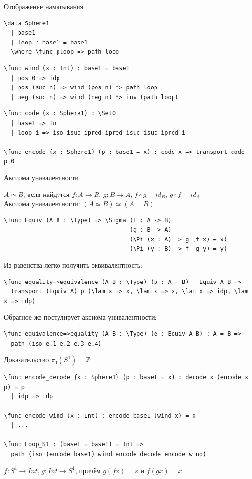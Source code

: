 \documentclass[aspectratio=169,dvipsnames,usenames]{beamer}
\begin{document}
\begin{frame}[fragile]{Отображение наматывания}
\begin{verbatim}
\data Sphere1
  | base1
  | loop : base1 = base1
  \where \func ploop => path loop
\end{verbatim}

\begin{verbatim}
\func wind (x : Int) : base1 = base1
  | pos 0 => idp
  | pos (suc n) => wind (pos n) *> path loop
  | neg (suc n) => wind (neg n) *> inv (path loop)
\end{verbatim}

\begin{verbatim}
\func code (x : Sphere1) : \Set0
  | base1 => Int
  | loop i => iso isuc ipred ipred_isuc isuc_ipred i

\func encode (x : Sphere1) (p : base1 = x) : code x => transport code p 0
\end{verbatim}
\end{frame}

\begin{frame}[fragile]{Аксиома унивалентности}
\begin{dfn}
$A \simeq B$, если найдутся $f: A \rightarrow B$, $g: B \rightarrow A$, $f\circ g = id_B$, $g \circ f = id_A$\\
Аксиома унивалентности: $(A \simeq B) \simeq (A = B)$ \end{dfn}

\small
\begin{verbatim}
\func Equiv (A B : \Type) => \Sigma (f : A -> B)
                                    (g : B -> A)
                                    (\Pi (x : A) -> g (f x) = x)
                                    (\Pi (y : B) -> f (g y) = y)
\end{verbatim}
\normalsize

Из равенства легко получить эквивалентность:
\small
\begin{verbatim}
\func equality=>equivalence (A B : \Type) (p : A = B) : Equiv A B =>
  transport (Equiv A) p (\lam x => x, \lam x => x, \lam x => idp, \lam x => idp)
\end{verbatim}
\normalsize

Обратное же постулирует аксиома унивалентности:
\small
\begin{verbatim}
\func equivalence=>equality (A B : \Type) (e : Equiv A B) : A = B =>
  path (iso e.1 e.2 e.3 e.4)
\end{verbatim}
\normalsize
\end{frame}

\begin{frame}[fragile]{Доказательство $\pi_1(S^1) = \mathbb{Z}$}
\begin{verbatim}
\func encode_decode {x : Sphere1} (p : base1 = x) : decode x (encode x p) = p
  | idp => idp

\func encode_wind (x : Int) : encode base1 (wind x) = x
  | ...

\func Loop_S1 : (base1 = base1) = Int =>
  path (iso (encode base1) wind encode_decode encode_wind)
\end{verbatim}

$f : S^1 \rightarrow Int$, $g : Int \rightarrow S^1$, причём $g(f x) = x$ и $f(g x) = x$.
\end{frame}
\end{document}
